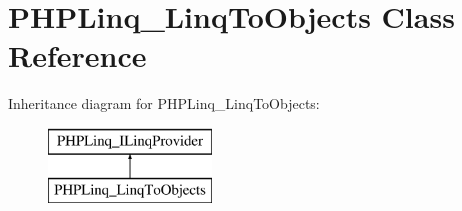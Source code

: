 \hypertarget{class_p_h_p_linq___linq_to_objects}{\section{\-P\-H\-P\-Linq\-\_\-\-Linq\-To\-Objects \-Class \-Reference}
\label{class_p_h_p_linq___linq_to_objects}
}
\-Inheritance diagram for \-P\-H\-P\-Linq\-\_\-\-Linq\-To\-Objects\-:\begin{figure}[H]
\begin{center}
\leavevmode
\includegraphics[height=2.000000cm]{class_p_h_p_linq___linq_to_objects}
\end{center}
\end{figure}
